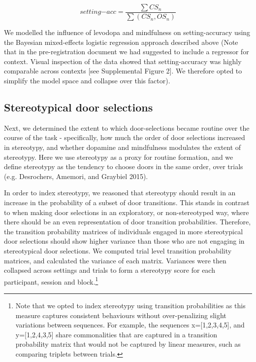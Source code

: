 \documentclass{article}
\begin{document}
\[
setting\mathrm{-}acc = \frac{\sum{CS_{n}}}{\sum{(CS_{n}, OS_{n})}}
\]

We modelled the influence of levodopa and mindfulness on
setting-accuracy using the Bayesian mixed-effects logistic regression
approach described above (Note that in the pre-registration document we
had suggested to include a regressor for context. Visual inspection of
the data showed that setting-accuracy was highly comparable across
contexts {[}see Supplemental Figure 2{]}. We therefore opted to simplify
the model space and collapse over this factor).

\hypertarget{stereotypical-door-selections}{%
\subsection{Stereotypical door
selections}\label{stereotypical-door-selections}}

Next, we determined the extent to which door-selections became routine
over the course of the task - specifically, how much the order of door
selections increased in stereotypy, and whether dopamine and mindfulness
modulates the extent of stereotypy. Here we use stereotypy as a proxy
for routine formation, and we define stereotypy as the tendency to
choose doors in the same order, over trials (e.g. Desrochers, Amemori,
and Graybiel 2015).

In order to index stereotypy, we reasoned that stereotypy should result
in an increase in the probability of a subset of door transitions. This
stands in contrast to when making door selections in an exploratory, or
non-stereotyped way, where there should be an even representation of
door transition probabilities. Therefore, the transition probability
matrices of individuals engaged in more stereotypical door selections
should show higher variance than those who are not engaging in
stereotypical door selections. We computed trial level transition
probability matrices, and calculated the variance of each matrix.
Variances were then collapsed across settings and trials to form a
stereotypy score for each participant, session and block.\footnote{Note
  that we opted to index stereotypy using transition probabilities as
  this measure captures consistent behaviours without over-penalizing
  slight variations between sequences. For example, the sequences
  x={[}1,2,3,4,5{]}, and y={[}1,2,4,3,5{]} share commonalities that are
  captured in a transition probability matrix that would not be captured
  by linear measures, such as comparing triplets between trials.}
\end{document}
